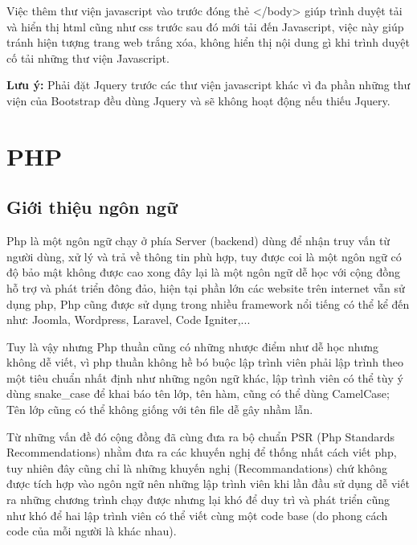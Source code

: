 Việc thêm thư viện javascript vào trước đóng thẻ </body> giúp trình duyệt tải và hiển thị html cũng như css trước sau đó mới tải đến Javascript, việc này giúp tránh hiện tượng trang web trắng xóa, không hiển thị nội dung gì khi trình duyệt cố tải những thư viện Javascript.\par
\textbf{Lưu ý:} Phải đặt Jquery trước các thư viện javascript khác vì đa phần những thư viện của Bootstrap đều dùng Jquery và sẽ không hoạt động nếu thiếu Jquery.
\section{PHP}
\subsection{Giới thiệu ngôn ngữ}
Php là một ngôn ngữ chạy ở phía Server (backend) dùng để nhận truy vấn từ người dùng, xử lý và trả về thông tin phù hợp, tuy được coi là một ngôn ngữ có độ bảo mật không được cao xong đây lại là một ngôn ngữ dễ học với cộng đồng hỗ trợ và phát triển đông đảo, hiện tại phần lớn các website trên internet vẫn sử dụng php, Php cũng được sử dụng trong nhiều framework nổi tiếng có thể kể đến như: Joomla, Wordpress, Laravel, Code Igniter,...\par
Tuy là vậy nhưng Php thuần cũng có những nhược điểm như dễ học nhưng không dễ viết, vì php thuần không hề bó buộc lập trình viên phải lập trình theo một tiêu chuẩn nhất định như những ngôn ngữ khác, lập trình viên có thể tùy ý dùng snake\_case để khai báo tên lớp, tên hàm, cũng có thể dùng CamelCase; Tên lớp cũng có thể không giống với tên file dễ gây nhầm lẫn.\par
Từ những vấn đề đó cộng đồng đã cùng đưa ra bộ chuẩn PSR (Php Standards Recommendations) nhằm đưa ra các khuyến nghị để thống nhất cách viết php, tuy nhiên đây cũng chỉ là những khuyến nghị (Recommandations) chứ không được tích hợp vào ngôn ngữ nên những lập trình viên khi lần đầu sử dụng dễ viết ra những chương trình chạy được nhưng lại khó để duy trì và phát triển cũng như khó để hai lập trình viên có thể viết cùng một code base (do phong cách code của mỗi người là khác nhau).
